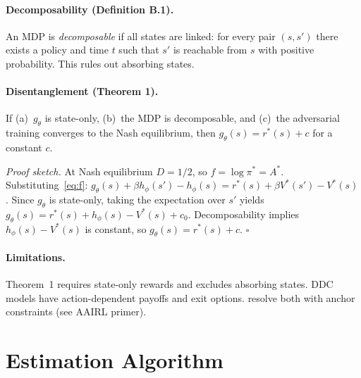 \documentclass[11pt]{article}
\begin{document}
\paragraph{Decomposability (Definition B.1).}
An MDP is \emph{decomposable} if all states are linked: for every pair $(s, s')$ there exists a policy and time $t$ such that $s'$ is reachable from $s$ with positive probability.
This rules out absorbing states.

\paragraph{Disentanglement (Theorem 1).}
If (a)~$g_\theta$ is state-only, (b)~the MDP is decomposable, and (c)~the adversarial training converges to the Nash equilibrium, then $g_\theta(s) = r^*(s) + c$ for a constant $c$.

\emph{Proof sketch.}
At Nash equilibrium $D = 1/2$, so $f = \log \pi^* = A^*$.
Substituting~\eqref{eq:f}: $g_\theta(s) + \beta h_\phi(s') - h_\phi(s) = r^*(s) + \beta V^*(s') - V^*(s)$.
Since $g_\theta$ is state-only, taking the expectation over $s'$ yields $g_\theta(s) = r^*(s) + h_\phi(s) - V^*(s) + c_0$.
Decomposability implies $h_\phi(s) - V^*(s)$ is constant, so $g_\theta(s) = r^*(s) + c$. \hfill $\square$

\paragraph{Limitations.}
Theorem~1 requires state-only rewards and excludes absorbing states.
DDC models have action-dependent payoffs and exit options.
\citet{lee2026} resolve both with anchor constraints (see AAIRL primer).

\section{Estimation Algorithm}
\end{document}
